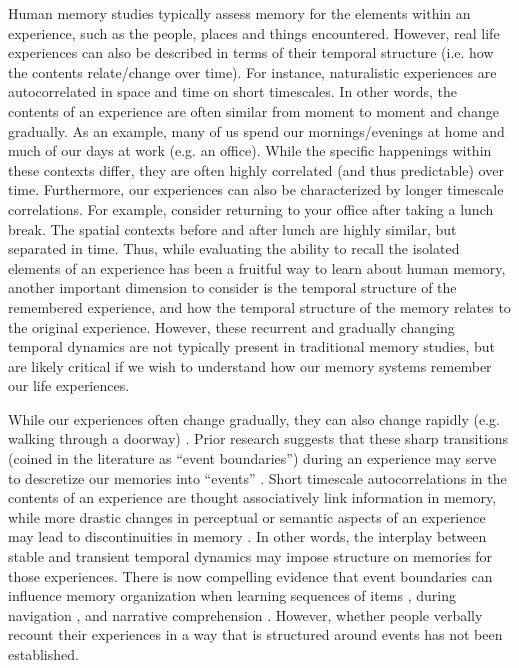 \documentclass{article}
\begin{document}
{Human memory studies typically assess memory for the elements within an experience, such as the people, places and things encountered. However, real life experiences can also be described in terms of their temporal structure (i.e. how the contents relate/change over time).  For instance, naturalistic experiences are autocorrelated in space and time on short timescales. In other words, the contents of an experience are often similar from moment to moment and change gradually. As an example, many of us spend our mornings/evenings at home and much of our days at work (e.g. an office). While the specific happenings within these contexts differ, they are often highly correlated (and thus predictable) over time. Furthermore, our experiences can also be characterized by longer timescale correlations. For example, consider returning to your office after taking a lunch break. The spatial contexts before and after lunch are highly similar, but separated in time. Thus, while evaluating the ability to recall the isolated elements of an experience has been a fruitful way to learn about human memory, another important dimension to consider is the temporal structure of the remembered experience, and how the temporal structure of the memory relates to the original experience. However, these recurrent and gradually changing temporal dynamics are not typically present in traditional memory studies, but are likely critical if we wish to understand how our memory systems remember our life experiences.

While our experiences often change gradually, they can also change rapidly (e.g. walking through a doorway) \citep{RadvZack17}. Prior research suggests that these sharp transitions (coined in the literature as ``event boundaries'') during an experience may serve to descretize our memories into ``events'' \citep{RadvZack17, BrunEtal18, HeusEtal18, ClewDava17, EzzyDava11, DuBrDava13}. Short timescale autocorrelations in the contents of an experience are thought associatively link information in memory, while more drastic changes in perceptual or semantic aspects of an experience may lead to discontinuities in memory \citep{HeusEtal18, BrunEtal18, EzzyDava11, DuBrDava13}.  In other words, the interplay between stable and transient temporal dynamics may impose structure on memories for those experiences. There is now compelling evidence that event boundaries can influence memory organization when learning sequences of items \citep{HeusEtal18, DuBrDava13}, during navigation \citep{BrunEtal18}, and narrative comprehension \citep{ZwaaRadv98, EzzyDava11}.  However, whether people verbally recount their experiences in a way that is structured around events has not been established.

}
\end{document}
